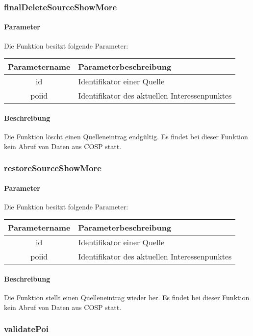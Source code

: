 \subsubsection{finalDeleteSourceShowMore}
\paragraph{Parameter} Die Funktion besitzt folgende Parameter:
\begin{table}[H]
	\begin{tabular}{|c|p{11cm}|}
		\hline
		\textbf{Parametername} & \textbf{Parameterbeschreibung} \\ \hline
		id    & Identifikator einer Quelle \\ \hline
		poiid & Identifikator des aktuellen Interessenpunktes \\ \hline
	\end{tabular}
\end{table}
\paragraph{Beschreibung} Die Funktion löscht einen Quelleneintrag endgültig. Es findet bei dieser Funktion kein Abruf von Daten aus {\glqq COSP\grqq} statt.
\subsubsection{restoreSourceShowMore}
\paragraph{Parameter} Die Funktion besitzt folgende Parameter:
\begin{table}[H]
	\begin{tabular}{|c|p{11cm}|}
		\hline
		\textbf{Parametername} & \textbf{Parameterbeschreibung} \\ \hline
		id    & Identifikator einer Quelle \\ \hline
		poiid & Identifikator des aktuellen Interessenpunktes \\ \hline
	\end{tabular}
\end{table}
\paragraph{Beschreibung} Die Funktion stellt einen Quelleneintrag wieder her. Es findet bei dieser Funktion kein Abruf von Daten aus {\glqq COSP\grqq} statt.
\subsubsection{validatePoi}
